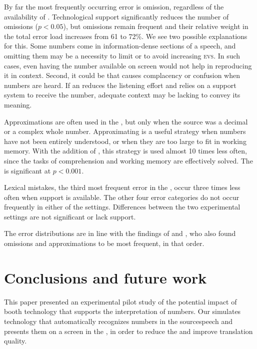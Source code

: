 \documentclass[output=paper]{langsci/langscibook}
\begin{document}
By far the most frequently occurring error is omission, regardless of the availability of . Technological support significantly reduces the number of omissions ($p < 0.05$), but omissions remain frequent and their relative weight in the total error load increases from 61 to 72\%. We see two possible explanations for this. Some numbers come in information-dense sections of a speech, and omitting them may be a necessity to limit  or to avoid increasing \textsc{evs}. In such cases, even having the number available on screen would not help in reproducing it in context. Second, it could be that  causes complacency or confusion when numbers are heard. If an  reduces the listening effort and relies on a support system to receive the number, adequate context may be lacking to convey its meaning.

Approximations are often used in the , but only when the source  was a decimal or a complex whole number. Approximating is a useful strategy when numbers have not been entirely understood, or when they are too large to fit in working memory. With the addition of , this strategy is used almost 10 times less often, since the tasks of comprehension and working memory are effectively solved. The  is significant at $p < 0.001$.

Lexical mistakes, the third most frequent error in the , occur three times less often when support is available. The other four error categories do not occur frequently in either of the settings. Differences between the two experimental settings are not significant or lack support.

The error distributions are in line with the findings of \citet{Mazza2001} and \citet{Pinochi2009}, who also found omissions and approximations to be most frequent, in that order.

\section{Conclusions and future work}\largerpage[1]

This paper presented an experimental pilot study of the potential impact of booth technology that supports the interpretation of numbers. Our  simulates technology that automatically recognizes numbers in the source\linebreak speech and presents them on a screen in the , in order to reduce the  and improve translation quality. 
\end{document}
